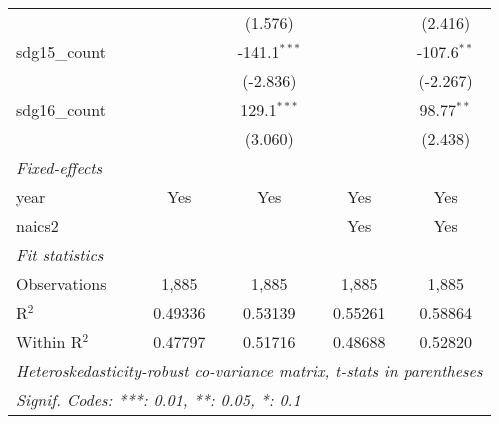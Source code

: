 \begin{tabular}{lcccc}
                     &                  & (1.576)          &                 & (2.416)\\   
   sdg15\_count      &                  & -141.1$^{***}$   &                 & -107.6$^{**}$\\   
                     &                  & (-2.836)         &                 & (-2.267)\\   
   sdg16\_count      &                  & 129.1$^{***}$    &                 & 98.77$^{**}$\\   
                     &                  & (3.060)          &                 & (2.438)\\   
   \midrule
   \emph{Fixed-effects}\\
   year              & Yes              & Yes              & Yes             & Yes\\  
   naics2            &                  &                  & Yes             & Yes\\  
   \midrule
   \emph{Fit statistics}\\
   Observations      & 1,885            & 1,885            & 1,885           & 1,885\\  
   R$^2$             & 0.49336          & 0.53139          & 0.55261         & 0.58864\\  
   Within R$^2$      & 0.47797          & 0.51716          & 0.48688         & 0.52820\\  
   \midrule \midrule
   \multicolumn{5}{l}{\emph{Heteroskedasticity-robust co-variance matrix, t-stats in parentheses}}\\
   \multicolumn{5}{l}{\emph{Signif. Codes: ***: 0.01, **: 0.05, *: 0.1}}\\
\end{tabular}
\par\endgroup


